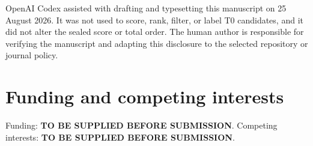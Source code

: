 \documentclass[11pt]{article}
\begin{document}
OpenAI Codex assisted with drafting and typesetting this manuscript on 25 August 2026. It was not
used to score, rank, filter, or label T0 candidates, and it did not alter the sealed score or total
order. The human author is responsible for verifying the manuscript and adapting this disclosure
to the selected repository or journal policy.

\section*{Funding and competing interests}

Funding: \textbf{TO BE SUPPLIED BEFORE SUBMISSION}. Competing interests:
\textbf{TO BE SUPPLIED BEFORE SUBMISSION}.



\end{document}
